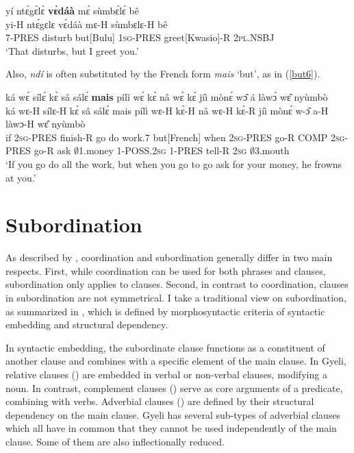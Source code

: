 \begin{exe} 
\ex\label{but5}
  \glll      yí ntɛ́gɛ̀lɛ̀ {\bfseries vɛ̀dáà} mɛ́ sùmbɛ́lɛ́ bê \\
           yi-H ntɛ́gɛlɛ vɛ̀dáà mɛ-H sùmbɛlɛ-H bê \\
              7-PRES disturb but[Bulu] 1\textsc{sg}-PRES greet[Kwasio]-R 2\textsc{pl}.NSBJ  \\
    \trans `That disturbs, but I greet you.'
\end{exe}

\noindent Also, {\itshape ndí} is often substituted by the French form {\itshape mais} `but', as in (\ref{but6}).

\begin{exe} 
\ex\label{but6}
  \glll ká wɛ́ sílɛ́ kɛ̀ sâ sálɛ́ {\bfseries mais} pílì wɛ́ kɛ́ nâ  wɛ́ kɛ́ jíì mònɛ́ wɔ̂ á làwɔ́ wɛ̂ nyùmbò\\
        ká wɛ-H sílɛ-H kɛ̀ sâ sálɛ́ mais pílì wɛ-H kɛ̀-H nâ  wɛ-H kɛ̀-R jíì mònɛ́ w-ɔ̂ a-H làwɔ-H wɛ̂ nyùmbò\\
         if 2\textsc{sg}-PRES finish-R go do work.7 but[French] when 2\textsc{sg}-PRES go-R COMP 2\textsc{sg}-PRES go-R ask $\emptyset$1.money 1-POSS.2\textsc{sg} 1-PRES tell-R 2\textsc{sg} $\emptyset$3.mouth   \\
    \trans `If you go do all the work, but when you go to go ask for your money, he frowns at you.'
\end{exe}





\section{Subordination}
\label{sec:Sub}

As described by \citet[46-48]{haspelmath2007}, coordination and subordination generally differ in two main respects. First, while coordination can be used for both phrases and clauses, subordination only applies to clauses. Second, in contrast to coordination, clauses in subordination are not symmetrical. 
I take a traditional view on subordination, as summarized in \citet[15]{cristofaro2003}, which is defined by morphosyntactic criteria of syntactic embedding and structural dependency. 

In syntactic embedding, the subordinate clause functions as a constituent of another clause and combines with a specific element of the main clause. In Gyeli, relative clauses () are embedded in verbal or non-verbal clauses, modifying a noun. In contrast, complement clauses () serve as core arguments of a predicate, combining with verbs. Adverbial clauses () are defined by their structural dependency on the main clause. Gyeli has several sub-types of adverbial clauses which all have in common that they cannot be used independently of the main clause. Some of them are also inflectionally reduced.













